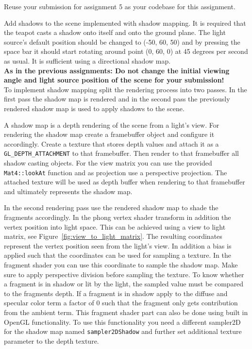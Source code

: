 \documentclass[12pt, a4paper, oneside, ngerman]{article}
\begin{document}






Reuse your submission for assignment 5 as your codebase for this assignment.

Add shadows to the scene implemented with shadow mapping.
It is required that the teapot casts a shadow onto itself and onto the ground plane. The light source's default position should be changed to (-50, 60, 50) and by pressing the space bar it should start rotating around point (0, 60, 0) at 45 degrees per second as usual. It is sufficient using a directional shadow map. \\

\textbf{As in the previous assignments: Do not change the initial viewing angle and light source position of the scene for your submission!}\\

To implement shadow mapping split the rendering process into two passes. In the first pass the shadow map is rendered and in the second pass the previously rendered shadow map is used to apply shadows to the scene.

A shadow map is a depth rendering of the scene from a light's view. For rendering the shadow map create a framebuffer object and configure it accordingly. Create a texture that stores depth values and attach it as a \texttt{GL\_DEPTH\_ATTACHMENT} to that framebuffer. Then render to that framebuffer all shadow casting objects. For the view matrix you can use the provided \texttt{Mat4::lookAt} function and as projection use a perspective projection. The attached texture will be used as depth buffer when rendering to that framebuffer and ultimately represents the shadow map.

In the second rendering pass use the rendered shadow map to shade the fragments accordingly. In the phong vertex shader transform in addition the vertex position into light space. This can be achieved using a view to light matrix, see Figure~\ref{fig:view_to_light_matrix}. The resulting coordinates represent the vertex position seen from the light's view. In addition a bias is applied such that the coordinates can be used for sampling a texture. In the fragment shader you can use this coordinate to sample the shadow map. Make sure to apply perspective division before sampling the texture. To know whether a fragment is in shadow or lit by the light, the sampled value must be compared to the fragments depth. If a fragment is in shadow apply to the diffuse and specular color term a factor of 0 such that the fragment only gets contribution from the ambient term. This fragment shader part can also be done using built in OpenGL functionality. To use this functionality you need a different sampler2D for the shadow map named \texttt{sampler2DShadow} and further set additional texture parameter to the depth texture. \\
\end{document}

